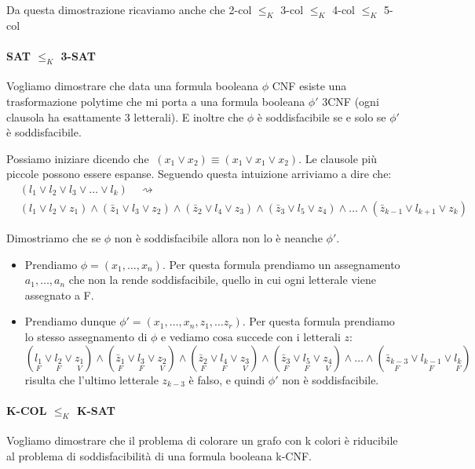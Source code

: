 \documentclass[a4paper]{article}
\theoremstyle{definition}
\begin{document}
			Da questa dimostrazione ricaviamo anche che 2-col $ \leq_K $ 3-col $ \leq_K $ 4-col $ \leq_K $ 5-col
			
			
			\paragraph{SAT $ \leq_K $ 3-SAT} Vogliamo dimostrare che data una formula booleana $ \phi $ CNF esiste una trasformazione polytime che mi porta a una formula booleana $ \phi' $ 3CNF (ogni clausola ha esattamente 3 letterali). E inoltre che $ \phi $ è soddisfacibile se e solo se $ \phi' $ è soddisfacibile.
			
			Possiamo iniziare dicendo che $ \ (x_1 \vee x_2) \equiv (x_1 \vee x_1 \vee x_2) $. Le clausole più piccole possono essere espanse. Seguendo questa intuizione arriviamo a dire che:
			\begin{align*}
				&(l_1 \vee l_2 \vee l_3 \vee \dots \vee l_k)\quad \rightsquigarrow\quad \\
				&(l_1\vee l_2\vee z_1) \wedge (\bar{z}_1\vee l_3 \vee z_2) \wedge (\bar{z}_2 \vee l_4\vee z_3)
				\wedge (\bar{z}_3 \vee l_5 \vee z_4) \wedge \dots \wedge (\bar{z}_{k-1} \vee l_{k+1} \vee z_k)
			\end{align*}
			
			Dimostriamo che se $ \phi $ non è soddisfacibile allora non lo è neanche $ \phi' $.
			\begin{itemize}
				\item Prendiamo $ \phi = (x_1 , \dots, x_n) $. Per questa formula prendiamo un assegnamento $ a_1, \dots, a_n $ che non la rende soddisfacibile, quello in cui ogni letterale viene assegnato a F.
				\item Prendiamo dunque $ \phi' = (x_1, \dots, x_n, z_1, \dots z_r) $. Per questa formula prendiamo lo stesso assegnamento di $ \phi $ e vediamo cosa succede con i letterali $ z $:
			\[
				(\underset{F}{l_1} \vee \underset{F}{l_2}\vee \underset{V}{z_1}) 
				\wedge (\underset{F}{\bar{z}_1}\vee \underset{F}{l_3} \vee \underset{V}{z_2}) 
				\wedge (\underset{F}{\bar{z}_2}\vee \underset{F}{l_4} \vee \underset{V}{z_3}) 
				\wedge (\underset{F}{\bar{z}_3}\vee \underset{F}{l_5} \vee \underset{V}{z_4})  \wedge 
				\dots 
				\wedge (\underset{F}{\bar{z}_{k-3}}\vee \underset{F}{l_{k-1}} \vee \underset{F}{l_{k}}) 
			\]
			risulta che l'ultimo letterale $ z_{k-3} $ è falso, e quindi $ \phi' $ non è soddisfacibile.
 			\end{itemize}
 			
 			\paragraph{K-COL $ \leq_K $ K-SAT} Vogliamo dimostrare che il problema di colorare un grafo con k colori è riducibile al problema di soddisfacibilità di una formula booleana k-CNF.
 			
\end{document}
